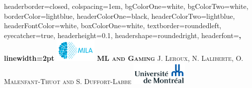 \documentclass[landscape,a0paper,fontscale=0.285]{baposter} %
\begin{document}
\begin{poster}
{
headerborder=closed, %
colspacing=1em, %
bgColorOne=white, %
bgColorTwo=white, %
borderColor=lightblue, %
headerColorOne=black, %
headerColorTwo=lightblue, %
headerFontColor=white, %
boxColorOne=white, %
textborder=roundedleft, %
eyecatcher=true, %
headerheight=0.1\textheight, %
headershape=roundedright, %
headerfont=\Large\bf\textsc, %
linewidth=2pt %
}
%
{\includegraphics[height=3em]{milalogo}} %
{\bf\textsc{ML and Gaming }\vspace{0.5em}} %
{\textsc{J. Leroux, N. Laliberte, O. Malenfant-Thuot and S. Duffort-Labbe \hspace{5pt}\hspace{5pt} }} %
{\includegraphics[height=3em]{udemlogo}} %



\end{poster}
\end{document}
